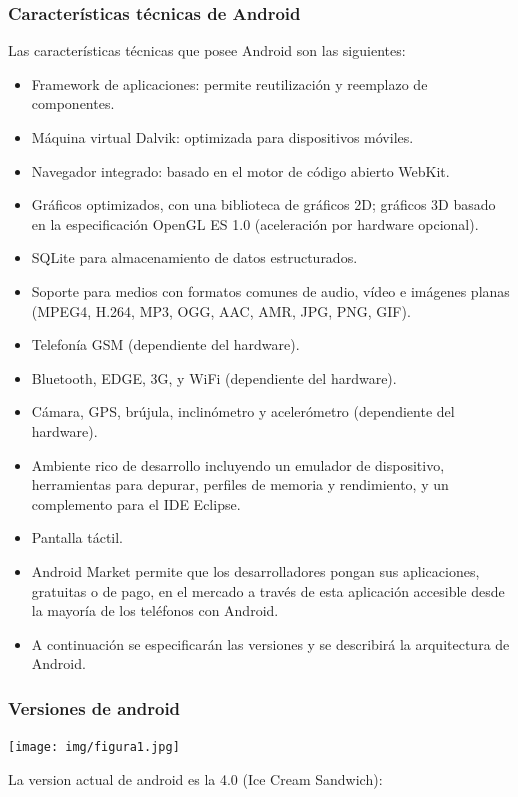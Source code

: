 \documentclass[12 pt, a4paper, twoside]{article}
\begin{document}
\subsubsection{Características técnicas de Android}
Las características técnicas que posee Android son las siguientes:
\begin{itemize}
\item Framework de aplicaciones: permite reutilización y reemplazo de
  componentes.
\item Máquina virtual Dalvik: optimizada para dispositivos móviles.
\item Navegador integrado: basado en el motor de código abierto
  WebKit.
\item Gráficos optimizados, con una biblioteca de gráficos 2D; gráficos 3D basado
en la especificación OpenGL ES 1.0 (aceleración por hardware
opcional).
\item SQLite para almacenamiento de datos estructurados.
\item Soporte para medios con formatos comunes de audio, vídeo e imágenes
planas (MPEG4, H.264, MP3, OGG, AAC, AMR, JPG, PNG, GIF).
\item Telefonía GSM (dependiente del hardware).
\item Bluetooth, EDGE, 3G, y WiFi (dependiente del hardware).
\item Cámara, GPS, brújula, inclinómetro y acelerómetro (dependiente del
hardware).
\item Ambiente rico de desarrollo incluyendo un emulador de dispositivo, herramientas
para depurar, perfiles de memoria y rendimiento, y un complemento
para el IDE Eclipse.
\item Pantalla táctil.
\item Android Market permite que los desarrolladores pongan sus aplicaciones,
gratuitas o de pago, en el mercado a través de esta aplicación accesible desde
la mayoría de los teléfonos con Android.
\item A continuación se especificarán las versiones y se describirá la arquitectura de
Android.
\end{itemize}

\subsubsection{Versiones de android}
\begin{center}
  \texttt{[image: img/figura1.jpg]}
\end{center}
La version actual de android es la 4.0 (Ice Cream Sandwich):
\end{document}
